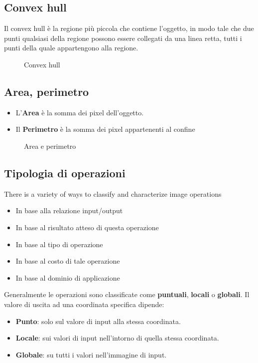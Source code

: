 \documentclass{report}
\begin{document}
\subsection{Convex hull}
\label{sec:convex}
Il convex hull è la regione più piccola che contiene l'oggetto, in
modo tale che due punti qualsiasi della regione possono essere collegati
da una linea retta, tutti i punti della quale appartengono alla regione.
\begin{figure}[ht!]
  \centering
  \resizebox{5cm}{!}{
    }
  \caption{Convex hull}
  \label{fig:convex}
\end{figure}

\subsection{Area, perimetro}
\label{sec:areaeper}

\begin{itemize}
\item L'\textbf{Area} è la somma dei pixel dell'oggetto.
\item Il \textbf{Perimetro} è la somma dei pixel appartenenti al confine
\end{itemize}
\clearpage
\begin{figure}[ht!]
  \centering
  \resizebox{10cm}{!}{
    }
  \caption{Area e perimetro}
  \label{fig:areaper}
\end{figure}

\subsection{Tipologia di operazioni}
\label{sec:tipop}
There is a variety of ways to classify and characterize image operations
\begin{itemize}
\item In base alla relazione input/output
\item In base al risultato atteso di questa operazione
\item In base al tipo di operazione 
\item In base al costo di tale operazione 
\item In base al dominio di applicazione
\end{itemize}
Generalmente le operazioni sono classificate come \textbf{puntuali},
\textbf{locali} o \textbf{globali}. Il valore di uscita ad una
coordinata specifica dipende:

\begin{itemize}
\item \textbf{Punto}: solo sul valore di input alla stessa coordinata.
\item \textbf{Locale}: sui valori di input nell'intorno di quella stessa
  coordinata. 
\item \textbf{Globale}: su tutti i valori nell'immagine di input.
\end{itemize}
\end{document}

